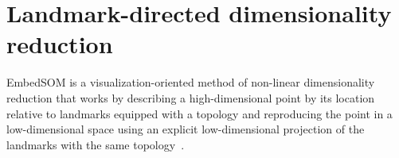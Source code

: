 \section{Landmark-directed dimensionality reduction\label{sec:methods}}

EmbedSOM is a visualization-oriented method of non-linear dimensionality reduction that works by describing a high-dimensional point by its location relative to landmarks equipped with a topology and reproducing the point in a low-dimensional space using an explicit low-dimensional projection of the landmarks with the same topology~\cite{kratochvil2019generalized}.


